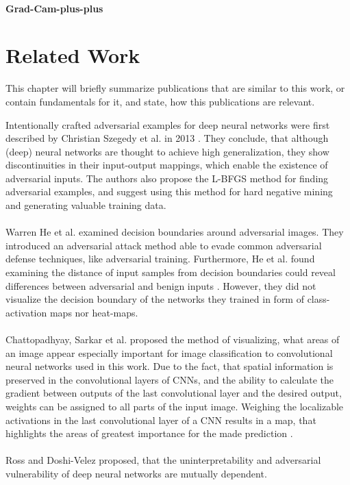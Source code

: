 \documentclass[draft,final]{vutinfth} %
\begin{document}
\subsubsection{Grad-Cam-plus-plus}

\chapter{Related Work}

This chapter will briefly summarize publications that are similar to this work, or contain fundamentals for it, and state, how this publications are relevant.

Intentionally crafted adversarial examples for deep neural networks were first described by Christian Szegedy et al. in 2013 \cite{Szegedy2013}.
They conclude, that although (deep) neural networks are thought to achieve high generalization, they show discontinuities in their input-output mappings, which enable the existence of adversarial inputs.
The authors also propose the L-BFGS method for finding adversarial examples, and suggest using this method for hard negative mining and generating valuable training data.\\
\\
Warren He et al. examined decision boundaries around adversarial images.
They introduced an adversarial attack method able to evade common adversarial defense techniques, like adversarial training.
Furthermore, He et al. found examining the distance of input samples from decision boundaries could reveal differences between adversarial and benign inputs \cite{He2018}.
However, they did not visualize the decision boundary of the networks they trained in form of class-activation maps nor heat-maps.\\
\\
Chattopadhyay, Sarkar et al. proposed the method of visualizing, what areas of an image appear especially important for image classification to convolutional neural networks used in this work. 
Due to the fact, that spatial information is preserved in the convolutional layers of CNNs, and the ability to calculate the gradient between outputs of the last convolutional layer and the desired output, weights can be assigned to all parts of the input image.
Weighing the localizable activations in the last convolutional layer of a CNN results in a map, that highlights the areas of greatest importance for the made prediction \cite{Chattopadhyay2017}.\\
\\
Ross and Doshi-Velez proposed, that the uninterpretability and adversarial vulnerability of deep neural networks are mutually dependent.
\end{document}
